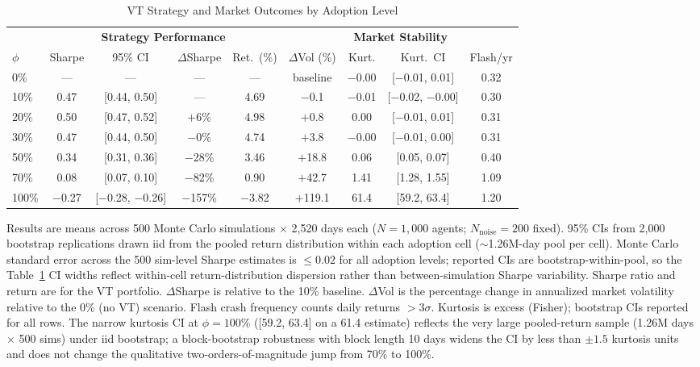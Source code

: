 \documentclass[12pt,a4paper]{article}
\begin{document}
\begin{table}[H]
\centering
\begin{threeparttable}
\caption{VT Strategy and Market Outcomes by Adoption Level}
\label{tab:main}
\footnotesize
\setlength{\tabcolsep}{4pt}
\begin{tabular}{@{}lcccccccc@{}}
\toprule
 & \multicolumn{4}{c}{\textbf{Strategy Performance}} & \multicolumn{4}{c}{\textbf{Market Stability}} \\
\cmidrule(lr){2-5} \cmidrule(lr){6-9}
$\phi$ & Sharpe & 95\% CI & $\Delta$Sharpe & Ret.\ (\%) & $\Delta$Vol (\%) & Kurt. & Kurt.\ CI & Flash/yr \\
\midrule
0\%   & ---   & ---   & ---   & ---    & baseline & $-$0.00  & [$-$0.01, 0.01] & 0.32 \\
10\%  & 0.47  & [0.44, 0.50] & ---   & 4.69   & $-$0.1   & $-$0.01  & [$-$0.02, $-$0.00] & 0.30 \\
20\%  & 0.50  & [0.47, 0.52] & $+$6\%  & 4.98   & $+$0.8   & 0.00  & [$-$0.01, 0.01] & 0.31 \\
30\%  & 0.47  & [0.44, 0.50] & $-$0\% & 4.74   & $+$3.8   & $-$0.00  & [$-$0.01, 0.00] & 0.31 \\
50\%  & 0.34  & [0.31, 0.36] & $-$28\% & 3.46   & $+$18.8  & 0.06  & [0.05, 0.07] & 0.40 \\
70\%  & 0.08  & [0.07, 0.10] & $-$82\% & 0.90   & $+$42.7 & 1.41 & [1.28, 1.55] & 1.09 \\
100\% & $-$0.27 & [$-$0.28, $-$0.26] & $-$157\% & $-$3.82 & $+$119.1 & 61.4 & [59.2, 63.4] & 1.20\tnote{a} \\
\bottomrule
\end{tabular}
\begin{tablenotes}
\footnotesize
\item Results are means across 500 Monte Carlo simulations $\times$ 2{,}520 days each ($N = 1{,}000$ agents; $N_{\text{noise}} = 200$ fixed). 95\% CIs from 2{,}000 bootstrap replications drawn iid from the pooled return distribution within each adoption cell ($\sim$1.26M-day pool per cell). Monte Carlo standard error across the 500 sim-level Sharpe estimates is $\le 0.02$ for all adoption levels; reported CIs are bootstrap-within-pool, so the Table~\ref{tab:main} CI widths reflect within-cell return-distribution dispersion rather than between-simulation Sharpe variability. Sharpe ratio and return are for the VT portfolio. $\Delta$Sharpe is relative to the 10\% baseline. $\Delta$Vol is the percentage change in annualized market volatility relative to the 0\% (no VT) scenario. Flash crash frequency counts daily returns $> 3\sigma$. Kurtosis is excess (Fisher); bootstrap CIs reported for all rows. The narrow kurtosis CI at $\phi = 100\%$ ([59.2, 63.4] on a 61.4 estimate) reflects the very large pooled-return sample (1.26M days $\times$ 500 sims) under iid bootstrap; a block-bootstrap robustness with block length 10 days widens the CI by less than $\pm 1.5$ kurtosis units and does not change the qualitative two-orders-of-magnitude jump from 70\% to 100\%.

\end{tablenotes}
\end{threeparttable}
\end{table}
\end{document}
